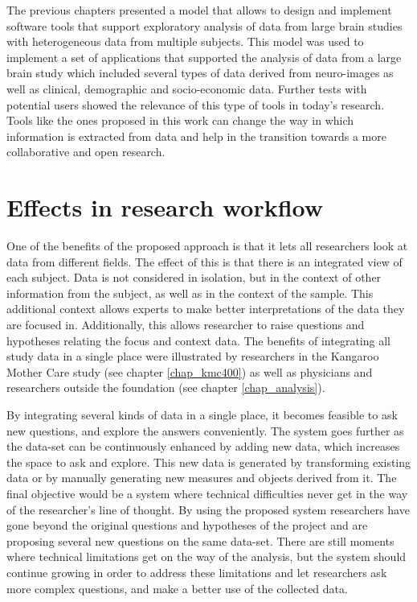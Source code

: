 The previous chapters presented a model that allows to design and implement software tools that support exploratory analysis of data from large brain studies with heterogeneous data from multiple subjects. This model was used to implement a set of applications that supported the analysis of data from a large brain study which included several types of data derived from neuro-images as well as clinical, demographic and socio-economic data. Further tests with potential users showed the relevance of this type of tools in today's research. Tools like the ones proposed in this work can change the way in which information is extracted from data and help in the transition towards a more collaborative and open research. 

\section{Effects in research workflow}



One of the benefits of the proposed approach is that it lets all researchers look at data from different fields. The effect of this is that there is an integrated view of each subject. Data is not considered in isolation, but in the context of other information from the subject, as well as in the context of the sample. This additional context allows experts to make better interpretations of the data they are focused in. Additionally, this allows researcher to raise questions and hypotheses relating the focus and context data. The benefits of integrating all study data in a single place were illustrated by researchers in the Kangaroo Mother Care study (see chapter \ref{chap_kmc400}) as well as physicians and researchers outside the foundation (see chapter \ref{chap_analysis}).

By integrating several kinds of data in a single place, it becomes feasible to ask new questions, and explore the answers conveniently. The system goes further as the data-set can be continuously enhanced by adding new data, which increases the space to ask and explore. This new data is generated by transforming existing data or by manually generating new measures and objects derived from it. The final objective would be a system where technical difficulties never get in the way of the researcher's line of thought. By using the proposed system researchers have gone beyond the original questions and hypotheses of the project and are proposing several new questions on the same data-set. There are still moments where technical limitations get on the way of the analysis, but the system should continue growing in order to address these limitations and let researchers ask more complex questions, and make a better use of the collected data.

